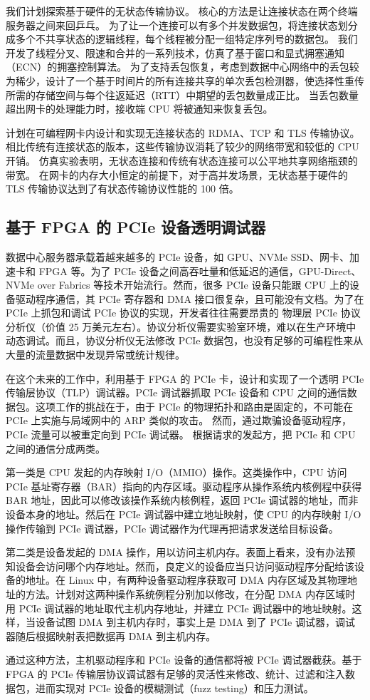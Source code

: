 我们计划探索基于硬件的无状态传输协议。
核心的方法是让连接状态在两个终端服务器之间来回乒乓。
为了让一个连接可以有多个并发数据包，将连接状态划分成多个不共享状态的逻辑线程，每个线程被分配一组特定序列号的数据包。
我们开发了线程分叉、限速和合并的一系列技术，仿真了基于窗口和显式拥塞通知（ECN）的拥塞控制算法。
为了支持丢包恢复，考虑到数据中心网络中的丢包较为稀少，设计了一个基于时间片的所有连接共享的单次丢包检测器，使选择性重传所需的存储空间与每个往返延迟（RTT）中期望的丢包数量成正比。
当丢包数量超出网卡的处理能力时，接收端 CPU 将被通知来恢复丢包。

计划在可编程网卡内设计和实现无连接状态的 RDMA、TCP 和 TLS 传输协议。
相比传统有连接状态的版本，这些传输协议消耗了较少的网络带宽和较低的 CPU 开销。
仿真实验表明，无状态连接和传统有状态连接可以公平地共享网络瓶颈的带宽。
在网卡的内存大小恒定的前提下，对于高并发场景，无状态基于硬件的 TLS 传输协议达到了有状态传输协议性能的 100 倍。



\subsection{基于 FPGA 的 PCIe 设备透明调试器}

数据中心服务器承载着越来越多的 PCIe 设备，如 GPU、NVMe SSD、网卡、加速卡和 FPGA 等。为了 PCIe 设备之间高吞吐量和低延迟的通信，GPU-Direct、NVMe over Fabrics 等技术开始流行。然而，很多 PCIe 设备只能跟 CPU 上的设备驱动程序通信，其 PCIe 寄存器和 DMA 接口很复杂，且可能没有文档。为了在 PCIe 上抓包和调试 PCIe 协议的实现，开发者往往需要昂贵的 物理层 PCIe 协议分析仪（价值 25 万美元左右）。协议分析仪需要实验室环境，难以在生产环境中动态调试。而且，协议分析仪无法修改 PCIe 数据包，也没有足够的可编程性来从大量的流量数据中发现异常或统计规律。

在这个未来的工作中，利用基于 FPGA 的 PCIe 卡，设计和实现了一个透明 PCIe 传输层协议（TLP）调试器。PCIe 调试器抓取 PCIe 设备和 CPU 之间的通信数据包。这项工作的挑战在于，由于 PCIe 的物理拓扑和路由是固定的，不可能在 PCIe 上实施与局域网中的 ARP 类似的攻击。
然而，通过欺骗设备驱动程序，PCIe 流量可以被重定向到 PCIe 调试器。
根据请求的发起方，把 PCIe 和 CPU 之间的通信分成两类。

第一类是 CPU 发起的内存映射 I/O（MMIO）操作。这类操作中，CPU 访问 PCIe 基址寄存器（BAR）指向的内存区域。驱动程序从操作系统内核例程中获得 BAR 地址，因此可以修改该操作系统内核例程，返回 PCIe 调试器的地址，而非设备本身的地址。然后在 PCIe 调试器中建立地址映射，使 CPU 的内存映射 I/O 操作传输到 PCIe 调试器，PCIe 调试器作为代理再把请求发送给目标设备。

第二类是设备发起的 DMA 操作，用以访问主机内存。表面上看来，没有办法预知设备会访问哪个内存地址。然而，良定义的设备应当只访问驱动程序分配给该设备的地址。在 Linux 中，有两种设备驱动程序获取可 DMA 内存区域及其物理地址的方法。计划对这两种操作系统例程分别加以修改，在分配 DMA 内存区域时用 PCIe 调试器的地址取代主机内存地址，并建立 PCIe 调试器中的地址映射。这样，当设备试图 DMA 到主机内存时，事实上是 DMA 到了 PCIe 调试器，调试器随后根据映射表把数据再 DMA 到主机内存。

通过这种方法，主机驱动程序和 PCIe 设备的通信都将被 PCIe 调试器截获。基于 FPGA 的 PCIe 传输层协议调试器有足够的灵活性来修改、统计、过滤和注入数据包，进而实现对 PCIe 设备的模糊测试（fuzz testing）和压力测试。
\fi